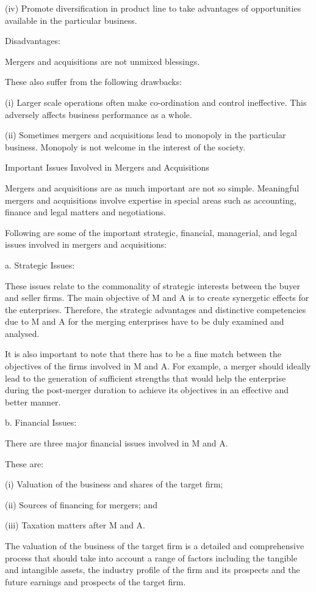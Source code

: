 \documentclass{article}
\begin{document}
(iv) Promote diversification in product line to take advantages of opportunities available in the particular business.

Disadvantages:

Mergers and acquisitions are not unmixed blessings.

These also suffer from the following drawbacks:

(i) Larger scale operations often make co-ordination and control ineffective. This adversely affects business performance as a whole.

(ii) Sometimes mergers and acquisitions lead to monopoly in the particular business. Monopoly is not welcome in the interest 
of the society.

Important Issues Involved in Mergers and Acquisitions

Mergers and acquisitions are as much important are not so simple. Meaningful mergers and acquisitions involve expertise in
 special areas such as accounting, finance and legal matters and negotiations.

Following are some of the important strategic, financial, managerial, and legal issues involved in mergers and acquisitions:

a. Strategic Issues:

These issues relate to the commonality of strategic interests between the buyer and seller firms. The main objective of M and A 
is to create synergetic effects for the enterprises. Therefore, the strategic advantages and distinctive competencies due to 
M and A for the merging enterprises have to be duly examined and analysed.

It is also important to note that there has to be a fine match between the objectives of the firms involved in M and A. 
For example, a merger should ideally lead to the generation of sufficient strengths that would help the enterprise during 
the post-merger duration to achieve its objectives in an effective and better manner.

b. Financial Issues:

There are three major financial issues involved in M and A.

These are:

(i) Valuation of the business and shares of the target firm;

(ii) Sources of financing for mergers; and

(iii) Taxation matters after M and A.

The valuation of the business of the target firm is a detailed and comprehensive process that should take into account a 
range of factors including the tangible and intangible assets, the industry profile of the firm and its prospects and the 
future earnings and prospects of the target firm.
\end{document}
